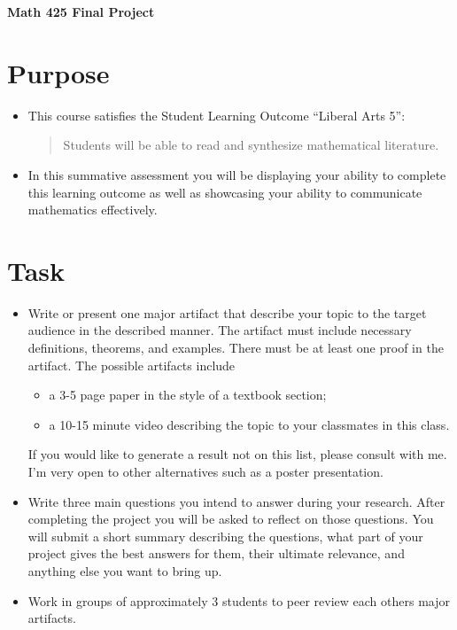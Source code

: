 \documentclass[12pt]{article}
\begin{document}
	\begin{center}
		{\Large \bf Math 425 Final Project}
	\end{center}
	\section*{Purpose}
	\begin{itemize}
		\item This course satisfies the Student Learning Outcome ``Liberal Arts 5'':
			\begin{quote}
				Students will be able to read and synthesize mathematical literature.
			\end{quote}
		\item In this summative assessment you will be displaying your ability to complete this learning outcome as well as showcasing your ability to communicate mathematics effectively.
	\end{itemize}
	\section*{Task}
	\begin{itemize}
		\item Write or present one major artifact that describe your topic to the target audience in the described manner. The artifact must include necessary definitions, theorems, and examples. There must be at least one proof in the artifact. The possible artifacts include
			\begin{itemize}
				\item a 3-5 page paper in the style of a textbook section;
				\item a 10-15 minute video describing the topic to your classmates in this class.
			\end{itemize}
			If you would like to generate a result not on this list, please consult with me. I'm very open to other alternatives such as a poster presentation.
		\item Write three main questions you intend to answer during your research. After completing the project you will be asked to reflect on those questions. You will submit a short summary describing the questions, what part of your project gives the best answers for them, their ultimate relevance, and anything else you want to bring up. 
		\item Work in groups of approximately 3 students to peer review each others major artifacts.
	\end{itemize}
\end{document}
